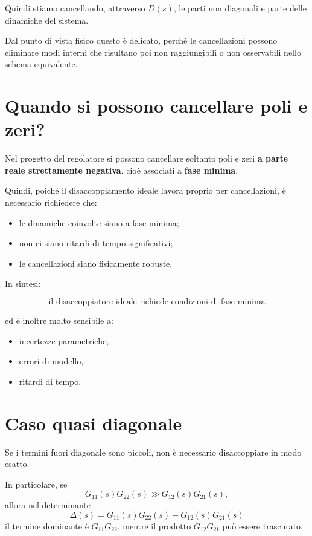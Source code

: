 Quindi stiamo cancellando, attraverso \(D(s)\), le parti non diagonali e parte delle dinamiche del sistema.

Dal punto di vista fisico questo è delicato, perché le cancellazioni possono eliminare modi interni che risultano poi non raggiungibili o non osservabili nello schema equivalente.

\section{Quando si possono cancellare poli e zeri?}

Nel progetto del regolatore si possono cancellare soltanto poli e zeri \textbf{a parte reale strettamente negativa}, cioè associati a \textbf{fase minima}.

Quindi, poiché il disaccoppiamento ideale lavora proprio per cancellazioni, è necessario richiedere che:

\begin{itemize}
    \item le dinamiche coinvolte siano a fase minima;
    \item non ci siano ritardi di tempo significativi;
    \item le cancellazioni siano fisicamente robuste.
\end{itemize}

In sintesi:

\[
\boxed{\text{il disaccoppiatore ideale richiede condizioni di fase minima}}
\]

ed è inoltre molto sensibile a:

\begin{itemize}
    \item incertezze parametriche,
    \item errori di modello,
    \item ritardi di tempo.
\end{itemize}

\section{Caso quasi diagonale}

Se i termini fuori diagonale sono piccoli, non è necessario disaccoppiare in modo esatto.

In particolare, se
\[
G_{11}(s)G_{22}(s)\gg G_{12}(s)G_{21}(s),
\]
allora nel determinante
\[
\Delta(s)=G_{11}(s)G_{22}(s)-G_{12}(s)G_{21}(s)
\]
il termine dominante è \(G_{11}G_{22}\), mentre il prodotto \(G_{12}G_{21}\) può essere trascurato.

